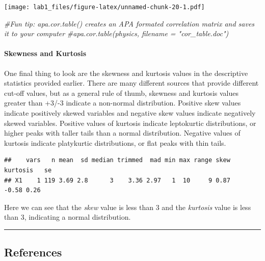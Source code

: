 \documentclass[
]{article}
\newenvironment{Shaded}{\begin{snugshade}}{\end{snugshade}}
\newcommand{\CommentTok}[1]{\textcolor[rgb]{0.56,0.35,0.01}{\textit{#1}}}
\newcommand{\FunctionTok}[1]{\textcolor[rgb]{0.00,0.00,0.00}{#1}}
\newcommand{\NormalTok}[1]{#1}
\newcommand{\SpecialCharTok}[1]{\textcolor[rgb]{0.00,0.00,0.00}{#1}}
\begin{document}
\texttt{[image: lab1\_files/figure-latex/unnamed-chunk-20-1.pdf]}

\begin{Shaded}
\begin{Highlighting}[]
\CommentTok{\#Fun tip: \textasciigrave{}apa.cor.table()\textasciigrave{} creates an APA formated correlation matrix and saves it to your computer}
\CommentTok{\#apa.cor.table(physics, filename = "cor\_table.doc")}
\end{Highlighting}
\end{Shaded}

\hypertarget{skewness-and-kurtosis}{%
\paragraph{Skewness and Kurtosis}\label{skewness-and-kurtosis}}

One final thing to look are the skewness and kurtosis values in the
descriptive statistics provided earlier. There are many different
sources that provide different cut-off values, but as a general rule of
thumb, skewness and kurtosis values greater than +3/-3 indicate a
non-normal distribution. Positive skew values indicate positively skewed
variables and negative skew values indicate negatively skewed variables.
Positive values of kurtosis indicate leptokurtic distributions, or
higher peaks with taller tails than a normal distribution. Negative
values of kurtosis indicate platykurtic distributions, or flat peaks
with thin tails.

\begin{Shaded}
\end{Shaded}

\begin{verbatim}
##    vars   n mean  sd median trimmed  mad min max range skew kurtosis   se
## X1    1 119 3.69 2.8      3    3.36 2.97   1  10     9 0.87    -0.58 0.26
\end{verbatim}

Here we can see that the \emph{skew} value is less than 3 and the
\emph{kurtosis} value is less than 3, indicating a normal distribution.

\begin{center}\rule{0.5\linewidth}{0.5pt}\end{center}

\hypertarget{references}{%
\subsection{References}\label{references}}
\end{document}

